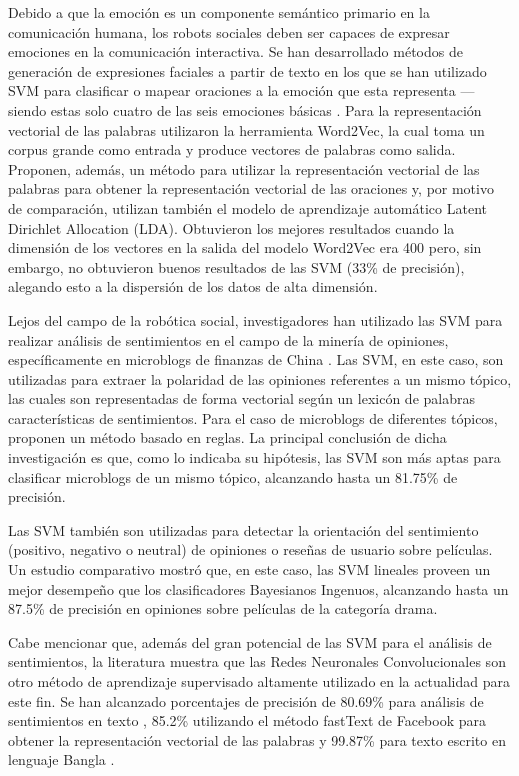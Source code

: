 \documentclass[conference]{IEEEtran}
\begin{document}
    Debido a que la emoción es un componente semántico primario en la comunicación humana, los robots sociales deben ser capaces de expresar emociones en la comunicación interactiva. Se han desarrollado métodos de generación de expresiones faciales a partir de texto en los que se han utilizado SVM para clasificar o mapear oraciones a la emoción que esta representa \cite{bai2014asentiment} --- siendo estas solo cuatro de las seis emociones básicas \cite{scherer1979nonlinguistic}. Para la representación vectorial de las palabras utilizaron la herramienta Word2Vec, la cual toma un corpus grande como entrada y produce vectores de palabras como salida. Proponen, además, un método para utilizar la representación vectorial de las palabras para obtener la representación vectorial de las oraciones y, por motivo de comparación, utilizan también el modelo de aprendizaje automático Latent Dirichlet Allocation (LDA). Obtuvieron los mejores resultados cuando la dimensión de los vectores en la salida del modelo Word2Vec era 400 pero, sin embargo, no obtuvieron buenos resultados de las SVM (33\% de precisión), alegando esto a la dispersión de los datos de alta dimensión.
    
    Lejos del campo de la robótica social, investigadores han utilizado las SVM para realizar análisis de sentimientos en el campo de la minería de opiniones, específicamente en microblogs de finanzas de China \cite{yan2018sentiment}. Las SVM, en este caso, son utilizadas para extraer la polaridad de las opiniones referentes a un mismo tópico, las cuales son representadas de forma vectorial según un lexicón de palabras características de sentimientos. Para el caso de microblogs de diferentes tópicos, proponen un método basado en reglas. La principal conclusión de dicha investigación es que, como lo indicaba su hipótesis, las SVM son más aptas para clasificar microblogs de un mismo tópico, alcanzando hasta un 81.75\% de precisión.

    Las SVM también son utilizadas para detectar la orientación del sentimiento (positivo, negativo o neutral) de opiniones o reseñas de usuario sobre películas. Un estudio comparativo mostró que, en este caso, las SVM lineales proveen un mejor desempeño que los clasificadores Bayesianos Ingenuos, alcanzando hasta un 87.5\% de precisión \cite{rana2016comparative} en opiniones sobre películas de la categoría drama.
    
    Cabe mencionar que, además del gran potencial de las SVM para el análisis de sentimientos, la literatura muestra que las Redes Neuronales Convolucionales son otro método de aprendizaje supervisado altamente utilizado en la actualidad para este fin. Se han alcanzado porcentajes de precisión de 80.69\% para análisis de sentimientos en texto \cite{chachra2017sentiment}, 85.2\% utilizando el método fastText de Facebook para obtener la representación vectorial de las palabras \cite{santos2017sentiment} y 99.87\% para texto escrito en lenguaje Bangla \cite{alam2017sentiment}.
    
\end{document}
